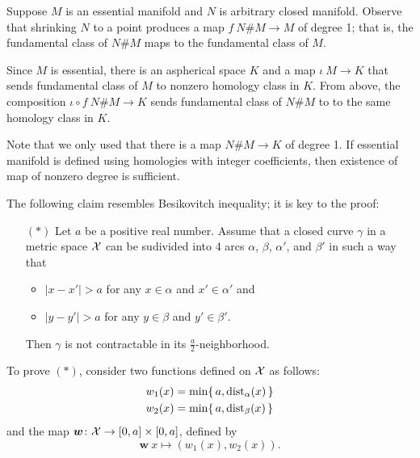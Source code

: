 
Suppose $M$ is an essential manifold and $N$ is arbitrary closed manifold.
Observe that shrinking $N$ to a point produces a map $f\:N\#M\to M$ of degree 1; that is, the fundamental class of $N\#M$ maps to the fundamental class of $M$.

Since $M$ is essential, there is an aspherical space $K$ and a map $\iota\:M\to K$ that sends fundamental class of $M$ to nonzero homology class in $K$.
From above, the composition $\iota\circ f\:N\#M\to K$  sends fundamental class of $N\#M$ to to the same homology class in $K$.

 Note that we only used that there is a map $N\#M\to K$ of degree 1. If essential manifold is defined using homologies with integer coefficients, then existence of map of nonzero degree is sufficient.

The following claim resembles Besikovitch inequality;
it is key to the proof:
\begin{itemize}
 \item[$({*})$] Let $a$ be a positive real number.
 Assume that a closed curve $\gamma$ in a metric space $\mathcal{X}$ can be sudivided into 4 arcs $\alpha$, $\beta$, $\alpha'$, and $\beta'$ in such a way that 
 \begin{itemize}
 \item $|x-x'|>a$ for any $x\in\alpha$ and $x'\in \alpha'$
 and
 \item $|y-y'|>a$ for any $y\in\beta$ and $y'\in \beta'$.
 \end{itemize}
 Then $\gamma$ is not contractable in its $\tfrac a2$-neighborhood.
\end{itemize}

To prove $({*})$, consider two functions defined on $\mathcal{X}$ as follows:
\begin{align*}
w_1(x)&=\min \{\,a,\mathrm{dist}_{\alpha}(x)\,\}
\\
w_2(x)&=\min \{\,a,\mathrm{dist}_{\beta}(x)\,\}
\end{align*}
and the map $\bm{w}\colon\mathcal{X}\to [0,a]\times[0,a]$, defined by
\[\bm{w}\:x\mapsto(w_1(x),w_2(x)).\]

